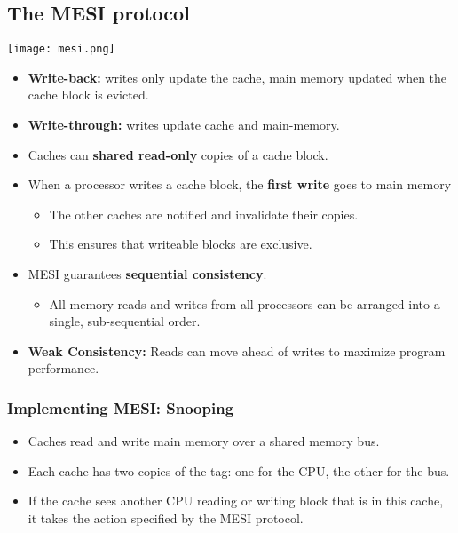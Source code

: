\documentclass[../main.tex]{subfiles}
\begin{document}
\subsection{The MESI protocol}

\begin{center}
	\texttt{[image: mesi.png]}
\end{center}

\begin{itemize}
	\item \textbf{Write-back:} writes only update the cache, main memory updated when the cache block is evicted.
	\item \textbf{Write-through:} writes update cache and main-memory.
\end{itemize}

\begin{itemize}
	\item Caches can \textbf{shared read-only} copies of a cache block.
	\item When a processor writes a cache block, the \textbf{first write} goes to main memory
	      \begin{itemize}
		      \item The other caches are notified and invalidate their copies.
		      \item This ensures that writeable blocks are exclusive.
	      \end{itemize}
	\item MESI guarantees \textbf{sequential consistency}.
	      \begin{itemize}
		      \item All memory reads and writes from all processors can be arranged into a single, sub-sequential order.
	      \end{itemize}
	\item \textbf{Weak Consistency:} Reads can move ahead of writes to maximize program performance.
\end{itemize}

\subsubsection{Implementing MESI: Snooping}

\begin{itemize}
	\item Caches read and write main memory over a shared memory bus.
	\item Each cache has two copies of the tag: one for the CPU, the other for the bus.
	\item If the cache sees another CPU reading or writing block that is in this cache, it takes the action specified by the MESI protocol.
\end{itemize}
\end{document}
